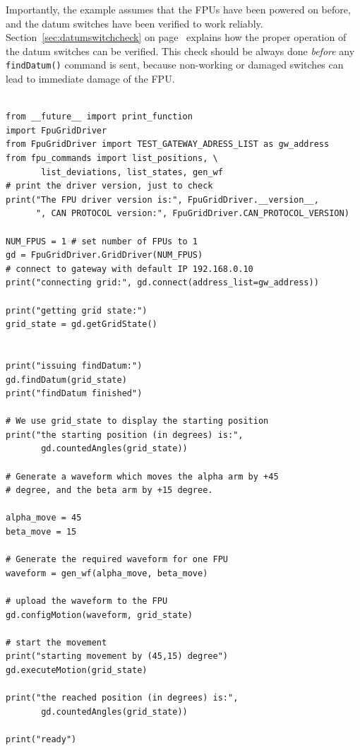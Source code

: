 \documentclass[11pt,a4paper]{report}
\begin{document}
Importantly, the example assumes that the FPUs have been powered on
before, and the datum switches have been verified to work
reliably. Section~\ref{sec:datumswitchcheck} on
page~\pageref{sec:datumswitchcheck} explains how the proper operation
of the datum switches can be verified. This check should be always
done \emph{before} any \texttt{findDatum()} command is sent, because
non-working or damaged switches can lead to immediate damage of the
FPU.


\begin{verbatim}

from __future__ import print_function
import FpuGridDriver
from FpuGridDriver import TEST_GATEWAY_ADRESS_LIST as gw_address
from fpu_commands import list_positions, \
       list_deviations, list_states, gen_wf
# print the driver version, just to check
print("The FPU driver version is:", FpuGridDriver.__version__,
      ", CAN PROTOCOL version:", FpuGridDriver.CAN_PROTOCOL_VERSION)

NUM_FPUS = 1 # set number of FPUs to 1
gd = FpuGridDriver.GridDriver(NUM_FPUS)
# connect to gateway with default IP 192.168.0.10
print("connecting grid:", gd.connect(address_list=gw_address))

print("getting grid state:")
grid_state = gd.getGridState()


print("issuing findDatum:")
gd.findDatum(grid_state)
print("findDatum finished")

# We use grid_state to display the starting position
print("the starting position (in degrees) is:",
       gd.countedAngles(grid_state))

# Generate a waveform which moves the alpha arm by +45
# degree, and the beta arm by +15 degree. 

alpha_move = 45
beta_move = 15

# Generate the required waveform for one FPU
waveform = gen_wf(alpha_move, beta_move)

# upload the waveform to the FPU
gd.configMotion(waveform, grid_state)

# start the movement
print("starting movement by (45,15) degree")
gd.executeMotion(grid_state)

print("the reached position (in degrees) is:",
       gd.countedAngles(grid_state))

print("ready")

\end{verbatim}
\end{document}
